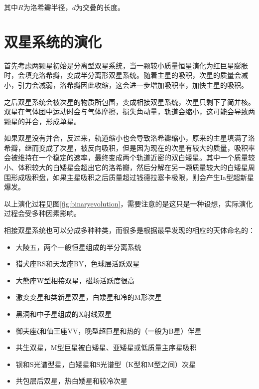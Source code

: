 \documentclass[openany]{ctexbook}
\begin{document}
其中$R$为洛希瓣半径，$d$为交叠的长度。

\section{双星系统的演化}
首先考虑两颗星初始是分离型双星系统，当一颗较小质量恒星演化为红巨星膨胀时，会填充洛希瓣，变成半分离形双星系统。随着主星的吸积，次星的质量会减小，引力会减弱，洛希瓣因此收缩，这会进一步增加吸积率，加快主星的吸积。

之后双星系统会被次星的物质所包围，变成相接双星系统，次星只剩下了简并核。双星在气体团中运动时会与气体摩擦，损失角动量，轨道会缩小，这可能会导致两颗星的并合，形成单星。

如果双星没有并合，反过来，轨道缩小也会导致洛希瓣缩小，原来的主星填满了洛希瓣，继而变成了次星，被反向吸积，但是因为现在的次星有较大的质量，吸积率会被维持在一个稳定的速率，最终变成两个轨道近密的双白矮星。其中一个质量较小、体积较大的白矮星会超出它的洛希瓣，然后分解在另一颗质量较大的白矮星周围形成吸积盘，如果主星吸积之后质量超过钱德拉塞卡极限，则会产生Ia型超新星爆发。

以上演化过程见图\ref{fig:binaryevolution}，需要注意的是这只是一种设想，实际演化过程会受多种因素影响。

相接双星系统也可以分成多种种类，而很多是根据最早发现的相应的天体命名的：
\begin{itemize}
  \item 大陵五，两个一般恒星组成的半分离系统
  \item 猎犬座RS和天龙座BY，色球层活跃双星
  \item 大熊座W型相接双星，磁场活跃度很高
  \item 激变变星和类新星双星，白矮星和冷的M形次星
  \item 黑洞和中子星组成的X射线双星
  \item 御夫座ζ和仙王座VV，晚型超巨星和热的（一般为B星）伴星
  \item 共生双星，M型巨星被白矮星、亚矮星或低质量主序星吸积
  \item 钡和S光谱型星，白矮星和S光谱型（K型和M型之间）次星
  \item 共包层后双星，热白矮星和较冷次星
\end{itemize}
\end{document}
